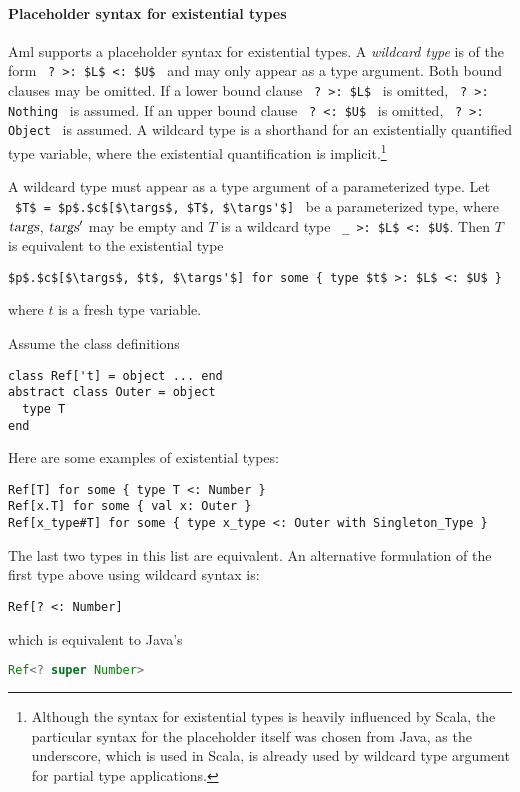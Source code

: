 \paragraph{Placeholder syntax for existential types}
\label{par:placeholder-existential-types}
Aml supports a placeholder syntax for existential types. A {\em wildcard type} is of the form ~\lstinline!? >: $L$ <: $U$!~ and may only appear as a type argument. Both bound clauses may be omitted. If a lower bound clause ~\lstinline!? >: $L$!~ is omitted, ~\lstinline!? >: Nothing!~ is assumed. If an upper bound clause ~\lstinline!? <: $U$!~ is omitted, ~\lstinline!? >: Object!~ is assumed. A wildcard type is a shorthand for an existentially quantified type variable, where the existential quantification is implicit.\footnote{Although the syntax for existential types is heavily influenced by Scala, the particular syntax for the placeholder itself was chosen from Java, as the underscore, which is used in Scala, is already used by wildcard type argument for partial type applications.}

A wildcard type must appear as a type argument of a parameterized type. Let ~\lstinline!$T$ = $p$.$c$[$\targs$, $T$, $\targs'$]!~ be a parameterized type, where $\mbox{\sl targs}$, $\mbox{\sl targs}'$ may be empty and $T$ is a wildcard type ~\lstinline!_ >: $L$ <: $U$!. Then $T$ is equivalent to the existential type
\begin{lstlisting}
$p$.$c$[$\targs$, $t$, $\targs'$] for some { type $t$ >: $L$ <: $U$ }
\end{lstlisting}
where $t$ is a fresh type variable. 

\example Assume the class definitions
\begin{lstlisting}
class Ref['t] = object ... end
abstract class Outer = object 
  type T
end
\end{lstlisting}

Here are some examples of existential types:
\begin{lstlisting}
Ref[T] for some { type T <: Number }
Ref[x.T] for some { val x: Outer }
Ref[x_type#T] for some { type x_type <: Outer with Singleton_Type }
\end{lstlisting}

The last two types in this list are equivalent. An alternative formulation of the first type above using wildcard syntax is:
\begin{lstlisting}
Ref[? <: Number]
\end{lstlisting}

which is equivalent to Java's
\begin{lstlisting}[language=Java]
Ref<? super Number>
\end{lstlisting}

